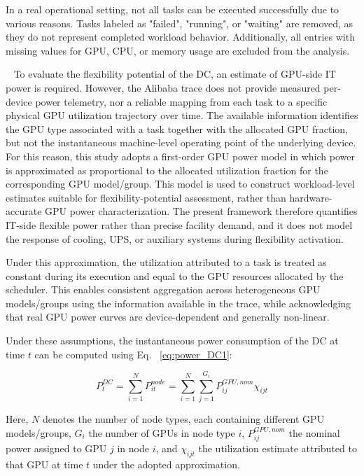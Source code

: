 \documentclass[preprint,12pt]{elsarticle}
\begin{document}
In a real operational setting, not all tasks can be executed successfully due to various reasons.  Tasks labeled as "failed", "running", or "waiting" are removed, as they do not represent completed workload behavior. Additionally, all entries with missing values for GPU, CPU, or memory usage are excluded from the analysis. 


\
To evaluate the flexibility potential of the DC, an estimate of GPU-side IT power is required. However, the Alibaba trace does not provide measured per-device power telemetry, nor a reliable mapping from each task to a specific physical GPU utilization trajectory over time. The available information identifies the GPU type associated with a task together with the allocated GPU fraction, but not the instantaneous machine-level operating point of the underlying device. For this reason, this study adopts a first-order GPU power model in which power is approximated as proportional to the allocated utilization fraction for the corresponding GPU model/group. This model is used to construct workload-level estimates suitable for flexibility-potential assessment, rather than hardware-accurate GPU power characterization. The present framework therefore quantifies IT-side flexible power rather than precise facility demand, and it does not model the response of cooling, UPS, or auxiliary systems during flexibility activation.

Under this approximation, the utilization attributed to a task is treated as constant during its execution and equal to the GPU resources allocated by the scheduler. This enables consistent aggregation across heterogeneous GPU models/groups using the information available in the trace, while acknowledging that real GPU power curves are device-dependent and generally non-linear.

Under these assumptions, the instantaneous power consumption of the DC at time $t$ can be computed using Eq. ~\ref{eq:power_DC1}:

\begin{equation} \label{eq:power_DC1}
P^{DC}_{t} = \sum_{i=1}^{N} P^{node}_{it} = \sum_{i=1}^{N} \sum_{j=1}^{G_i} P^{GPU, nom}_{ij} \chi_{ijt}
\end{equation}

Here, $N$ denotes the number of node types, each containing different GPU models/groups, $G_i$ the number of GPUs in node type $i$, $P^{GPU, nom}_{ij}$ the nominal power assigned to GPU $j$ in node $i$, and $\chi_{ijt}$ the utilization estimate attributed to that GPU at time $t$ under the adopted approximation. 
\end{document}

